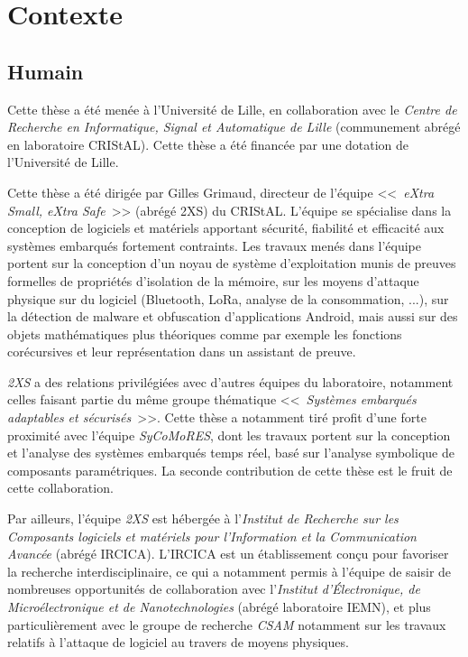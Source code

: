 
\section{Contexte}

\subsection{Humain}

Cette thèse a été menée à l'Université de Lille, en collaboration avec le \emph{Centre de Recherche en Informatique, Signal et Automatique de Lille} (communement abrégé en laboratoire CRIStAL). Cette thèse a été financée par une dotation de l'Université de Lille.

Cette thèse a été dirigée par Gilles Grimaud, directeur de l'équipe <<~\emph{eXtra Small, eXtra Safe}~>> (abrégé 2XS) du CRIStAL. L'équipe se spécialise dans la conception de logiciels et matériels apportant sécurité, fiabilité et efficacité aux systèmes embarqués fortement contraints. Les travaux menés dans l'équipe portent sur la conception d'un noyau de système d'exploitation munis de preuves formelles de propriétés d'isolation de la mémoire, sur les moyens d'attaque physique sur du logiciel (Bluetooth, LoRa, analyse de la consommation, ...), sur la détection de malware et obfuscation d'applications Android, mais aussi sur des objets mathématiques plus théoriques comme par exemple les fonctions corécursives et leur représentation dans un assistant de preuve.

\emph{2XS} a des relations privilégiées avec d'autres équipes du laboratoire, notamment celles faisant partie du même groupe thématique <<~\emph{Systèmes embarqués adaptables et sécurisés}~>>. Cette thèse a notamment tiré profit d'une forte proximité avec l'équipe \emph{SyCoMoRES}, dont les travaux portent sur la conception et l’analyse des systèmes embarqués temps réel, basé sur l’analyse symbolique de composants paramétriques. La seconde contribution de cette thèse est le fruit de cette collaboration.

Par ailleurs, l'équipe \emph{2XS} est hébergée à l'\emph{Institut de Recherche sur les Composants logiciels et matériels pour l’Information et la Communication Avancée} (abrégé IRCICA). L'IRCICA est un établissement conçu pour favoriser la recherche interdisciplinaire, ce qui a notamment permis à l'équipe de saisir de nombreuses opportunités de collaboration avec l'\emph{Institut d'Électronique, de Microélectronique et de Nanotechnologies} (abrégé laboratoire IEMN), et plus particulièrement avec le groupe de recherche \emph{CSAM} notamment sur les travaux relatifs à l'attaque de logiciel au travers de moyens physiques.


